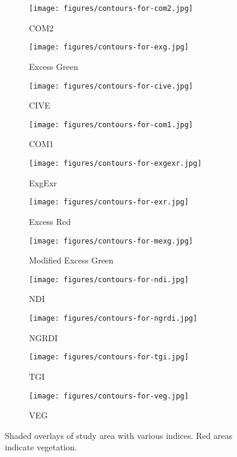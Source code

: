 \documentclass[letterpaper]{article}
\begin{document}
{{\begin{figure}[H]
\centering
\begin{subfigure}{.32\textwidth}
	\centering
	\texttt{[image: figures/contours-for-com2.jpg]}
	\caption{COM2}
\end{subfigure}
\begin{subfigure}{.32\textwidth}
	\centering
	\texttt{[image: figures/contours-for-exg.jpg]}
	\caption{Excess Green}
\end{subfigure}
\begin{subfigure}{.32\textwidth}
	\centering
	\texttt{[image: figures/contours-for-cive.jpg]}
	\caption{CIVE}
\end{subfigure}
\begin{subfigure}{.32\textwidth}
	\centering
	\texttt{[image: figures/contours-for-com1.jpg]}
	\caption{COM1}
\end{subfigure}
\begin{subfigure}{.32\textwidth}
	\centering
	\texttt{[image: figures/contours-for-exgexr.jpg]}
	\caption{ExgExr}
\end{subfigure}
\begin{subfigure}{.32\textwidth}
	\centering
	\texttt{[image: figures/contours-for-exr.jpg]}
	\caption{Excess Red}
\end{subfigure}
\begin{subfigure}{.32\textwidth}
	\centering
	\texttt{[image: figures/contours-for-mexg.jpg]}
	\caption{Modified Excess Green}
\end{subfigure}
\begin{subfigure}{.32\textwidth}
	\centering
	\texttt{[image: figures/contours-for-ndi.jpg]}
	\caption{NDI}
\end{subfigure}
\begin{subfigure}{.32\textwidth}
	\centering
	\texttt{[image: figures/contours-for-ngrdi.jpg]}
	\caption{NGRDI}
\end{subfigure}
\begin{subfigure}{.32\textwidth}
	\centering
	\texttt{[image: figures/contours-for-tgi.jpg]}
	\caption{TGI}
\end{subfigure}
\begin{subfigure}{.32\textwidth}
	\centering
	\texttt{[image: figures/contours-for-veg.jpg]}
	\caption{VEG}
\end{subfigure}
\caption{Shaded overlays of study area with various indices. Red areas indicate vegetation.}
\label{fig:overlays}
\end{figure}

}}
\end{document}
